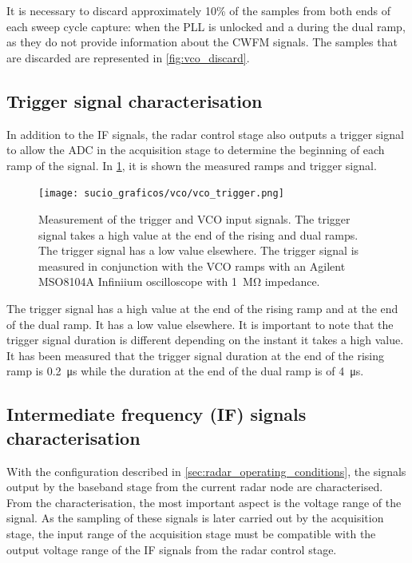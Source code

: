 It is necessary to discard approximately 10\% of the samples from both ends of each sweep cycle capture: when the PLL is unlocked and a during the dual ramp, as they do not provide information about the CWFM signals. The samples that are discarded are represented in \cref{fig:vco_discard}.

\subsection{Trigger signal characterisation} \label{sec:trigger_signal_characterisation}

In addition to the IF signals, the radar control stage also outputs a trigger signal to allow the ADC in the acquisition stage to determine the beginning of each ramp of the signal. In \cref{fig:trigger}, it is shown the measured ramps and trigger signal.

\begin{figure}[h]
	\centering
	\texttt{[image: sucio\_graficos/vco/vco\_trigger.png]} %
	\caption{Measurement of the trigger and VCO input signals. The trigger signal takes a high value at the end of the rising and dual ramps. The trigger signal has a low value elsewhere. The trigger signal is measured in conjunction with the VCO ramps with an Agilent MSO8104A Infiniium oscilloscope with \SI{1}{\mega\ohm} impedance.}
	\label{fig:trigger}
\end{figure}

The trigger signal has a high value at the end of the rising ramp and at the end of the dual ramp. It has a low value elsewhere. It is important to note that the trigger signal duration is different depending on the instant it takes a high value. It has been measured that the trigger signal duration at the end of the rising ramp is \SI{0.2}{\micro\second} while the duration at the end of the dual ramp is of \SI{4}{\micro\second}.

\subsection{Intermediate frequency (IF) signals characterisation} \label{sec:if_signals_characterisation}

With the configuration described in \cref{sec:radar_operating_conditions}, the signals output by the baseband stage from the current radar node are characterised. From the characterisation, the most important aspect is the voltage range of the signal. As the sampling of these signals is later carried out by the acquisition stage, the input range of the acquisition stage must be compatible with the output voltage range of the IF signals from the radar control stage.

